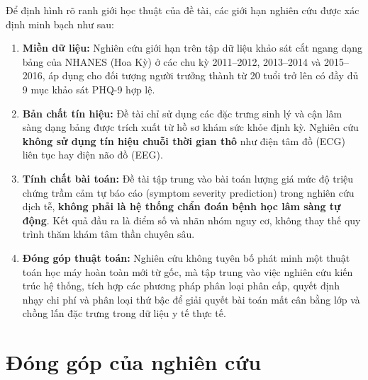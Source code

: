 Để định hình rõ ranh giới học thuật của đề tài, các giới hạn nghiên cứu được xác định minh bạch như sau:
\begin{enumerate}
    \item \textbf{Miền dữ liệu:} Nghiên cứu giới hạn trên tập dữ liệu khảo sát cắt ngang dạng bảng của NHANES (Hoa Kỳ) ở các chu kỳ 2011--2012, 2013--2014 và 2015--2016, áp dụng cho đối tượng người trưởng thành từ 20 tuổi trở lên có đầy đủ 9 mục khảo sát PHQ-9 hợp lệ.
    \item \textbf{Bản chất tín hiệu:} Đề tài chỉ sử dụng các đặc trưng sinh lý và cận lâm sàng dạng bảng được trích xuất từ hồ sơ khám sức khỏe định kỳ. Nghiên cứu \textbf{không sử dụng tín hiệu chuỗi thời gian thô} như điện tâm đồ (ECG) liên tục hay điện não đồ (EEG).
    \item \textbf{Tính chất bài toán:} Đề tài tập trung vào bài toán lượng giá mức độ triệu chứng trầm cảm tự báo cáo (symptom severity prediction) trong nghiên cứu dịch tễ, \textbf{không phải là hệ thống chẩn đoán bệnh học lâm sàng tự động}. Kết quả đầu ra là điểm số và nhãn nhóm nguy cơ, không thay thế quy trình thăm khám tâm thần chuyên sâu.
    \item \textbf{Đóng góp thuật toán:} Nghiên cứu không tuyên bố phát minh một thuật toán học máy hoàn toàn mới từ gốc, mà tập trung vào việc nghiên cứu kiến trúc hệ thống, tích hợp các phương pháp phân loại phân cấp, quyết định nhạy chi phí và phân loại thứ bậc để giải quyết bài toán mất cân bằng lớp và chồng lấn đặc trưng trong dữ liệu y tế thực tế.
\end{enumerate}

\section{Đóng góp của nghiên cứu}
\label{sec:dong-gop-nghien-cuu}

